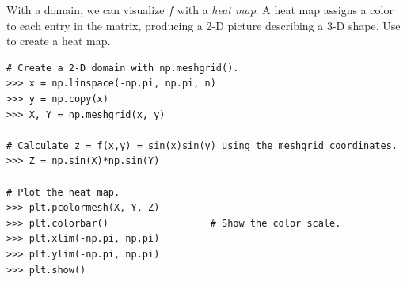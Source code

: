 With a domain, we can visualize $f$ with a \emph{heat map}.%
A heat map assigns a color to each entry in the matrix, producing a 2-D picture describing a 3-D shape.
Use  to create a heat map.

\begin{lstlisting}
# Create a 2-D domain with np.meshgrid().
>>> x = np.linspace(-np.pi, np.pi, n)
>>> y = np.copy(x)
>>> X, Y = np.meshgrid(x, y)

# Calculate z = f(x,y) = sin(x)sin(y) using the meshgrid coordinates.
>>> Z = np.sin(X)*np.sin(Y)

# Plot the heat map.
>>> plt.pcolormesh(X, Y, Z)
>>> plt.colorbar()                  # Show the color scale.
>>> plt.xlim(-np.pi, np.pi)
>>> plt.ylim(-np.pi, np.pi)
>>> plt.show()
\end{lstlisting}


